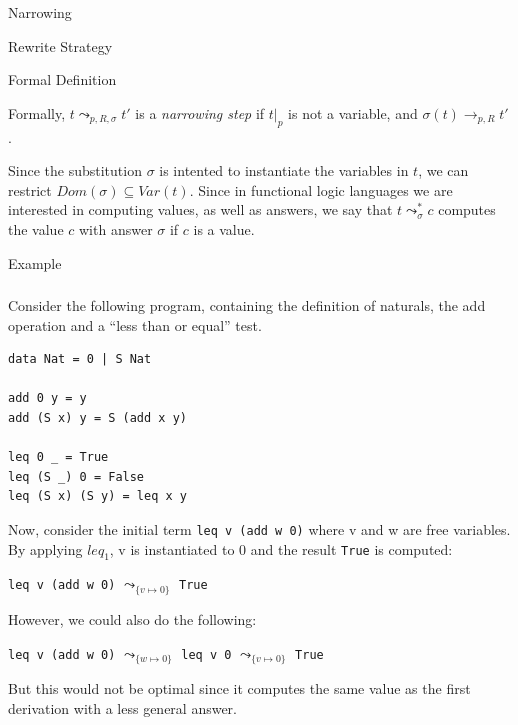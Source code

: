 \documentclass{beamer}
\begin{document}
\begin{section}{Narrowing}
\begin{subsection}{Rewrite Strategy}
\end{subsection}

\begin{subsection}{Formal Definition}
\begin{frame}
  Formally, $t \leadsto _{p,R,\sigma} t'$ is a \textit{narrowing step} if $t|_p$ is not a variable, and $\sigma(t) \rightarrow_{p,R} t'$.

  Since the substitution $\sigma$ is intented to instantiate the variables in $t$, we can restrict $Dom(\sigma) \subseteq Var(t)$. Since in functional logic languages we are interested in computing values, as well as answers, we say that $t \leadsto ^ * _ \sigma c$ computes the value $c$ with answer $\sigma$ if $c$ is a value.
  \end{frame}
\end{subsection}

\begin{subsection}{Example}
  
\begin{frame}
[fragile]

\frametitle{\subsecname}
  Consider the following program, containing the definition of naturals, the add operation and a ``less than or equal'' test.\\[0.5cm]


\begin{minipage}[b]{2in}
\begin{verbatim}
data Nat = 0 | S Nat

add 0 y = y
add (S x) y = S (add x y)

leq 0 _ = True
leq (S _) 0 = False
leq (S x) (S y) = leq x y
\end{verbatim}
\end{minipage}
\end{frame}

\begin{frame}[fragile]

  Now, consider the initial term \verb|leq v (add w 0)| where v and w are free variables. By applying $leq_1$, v is instantiated to 0 and the result \verb|True| is computed:

\begin{center}

\verb|leq v (add w 0)| $\leadsto_{\{v\mapsto 0\}}$ \verb|True|
  
\end{center}

However, we could also do the following:

\begin{center}

\verb|leq v (add w 0)| $\leadsto_{\{w\mapsto 0\}}$ \verb|leq v 0| $\leadsto_{\{v\mapsto 0\}}$ \verb|True|
  
\end{center}

But this would not be optimal since it computes the same value as the first derivation with a less general answer.

\end{frame}

\end{subsection}
\end{section}
\end{document}
